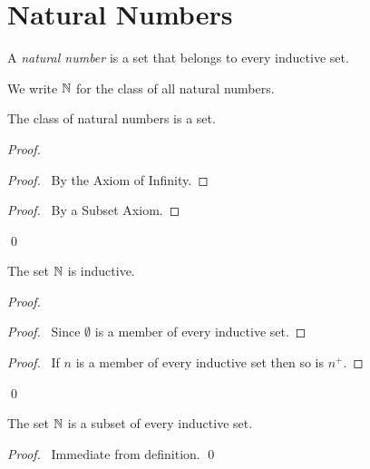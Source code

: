\section{Natural Numbers}

\begin{definition}
    A \emph{natural number} is a set that belongs to every inductive set.

    We write $\mathbb{N}$ for the class of all natural numbers.
\end{definition}

\begin{theorem}
    The class of natural numbers is a set.
\end{theorem}

\begin{proof}
    \pf
    \begin{proof}
        \pf\ By the Axiom of Infinity.
    \end{proof}
    \qedstep
    \begin{proof}
        \pf\ By a Subset Axiom.
    \end{proof}
    \qed
\end{proof}

\begin{theorem}
    The set $\mathbb{N}$ is inductive.
\end{theorem}

\begin{proof}
    \pf
    \begin{proof}
        \pf\ Since $\emptyset$ is a member of every inductive set.
    \end{proof}
    \begin{proof}
        \pf\ If $n$ is a member of every inductive set then so is $n^+$.
    \end{proof}
    \qed
\end{proof}

\begin{theorem}
    The set $\mathbb{N}$ is a subset of every inductive set.
\end{theorem}

\begin{proof}
    \pf\ Immediate from definition. \qed
\end{proof}

